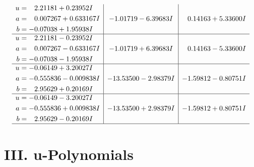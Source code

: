 \documentclass[1p]{elsarticle_modified}
\theoremstyle{definition}
\begin{document}
$$\begin{array}{c|c|c}
\begin{aligned}
u &= \phantom{-}2.21181 + 0.23952 I \\
a &= \phantom{-}0.007267 + 0.633167 I \\
b &= -0.07038 + 1.95938 I\end{aligned}
 & -1.01719 - 6.39683 I & \phantom{-}0.14163 + 5.33600 I \\ \hline\begin{aligned}
u &= \phantom{-}2.21181 - 0.23952 I \\
a &= \phantom{-}0.007267 - 0.633167 I \\
b &= -0.07038 - 1.95938 I\end{aligned}
 & -1.01719 + 6.39683 I & \phantom{-}0.14163 - 5.33600 I \\ \hline\begin{aligned}
u &= -0.06149 + 3.20027 I \\
a &= -0.555836 - 0.009838 I \\
b &= \phantom{-}2.95629 + 0.20169 I\end{aligned}
 & -13.53500 - 2.98379 I & -1.59812 - 0.80751 I \\ \hline\begin{aligned}
u &= -0.06149 - 3.20027 I \\
a &= -0.555836 + 0.009838 I \\
b &= \phantom{-}2.95629 - 0.20169 I\end{aligned}
 & -13.53500 + 2.98379 I & -1.59812 + 0.80751 I\\
 \hline 
 \end{array}$$\newpage
\newpage\renewcommand{\arraystretch}{1}
\centering \section*{ III. u-Polynomials}
\end{document}

